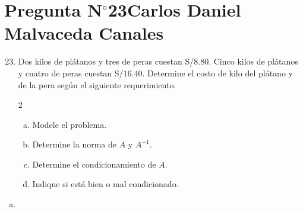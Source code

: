 \section{Pregunta N$^{\circ}$23\qquad Carlos Daniel Malvaceda Canales}

\begin{frame}
	\begin{enumerate}\setcounter{enumi}{22}
		\item

		      Dos kilos de plátanos y tres de peras cuestan S/$8.80$.
		      Cinco kilos de plátanos y cuatro de peras cuestan
		      S/$16.40$.
		      Determine el costo de kilo del plátano y de la pera según
		      el siguiente requerimiento.

		      \begin{multicols}{2}
			      \begin{enumerate}[a)]
				      \item

				            Modele el problema.

				      \item

				            Determine la norma de $A$ y $A^{-1}$.

				      \item

				            Determine el condicionamiento de $A$.

				      \item

				            Indique si está bien o mal condicionado.
			      \end{enumerate}
		      \end{multicols}
	\end{enumerate}
	\begin{solution}

		\begin{enumerate}[a)]
			\item


\end{enumerate}
\end{solution}
\end{frame}
